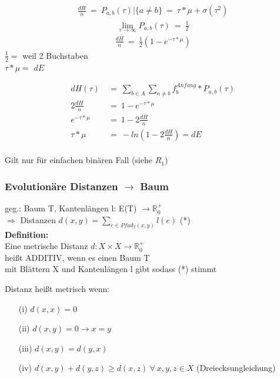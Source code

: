 \begin{align*}
	\frac{dH}{n}~=~P_{a,b} (\tau) | \{a \neq b\}~=~\tau * \mu + \sigma (\tau ^2)
\end{align*}
\begin{align*}
	\lim\limits_{\tau \rightarrow \infty} P_{a,b} (\tau)~=~ \frac{1}{2}
\end{align*}
\begin{align*}
 	\frac{dH}{n}~=~ \frac{1}{2} (1 - e^{-\tau * \mu})
\end{align*} 
$\frac{1}{2} =$ \color{orange} weil 2 Buchstaben\color{black}\\
$\tau * \mu =$ \color{orange} $dE$ \color{black}

\begin{align*}
 	dH(\tau) ~&=~ \sum \limits_{b \in A} \sum \limits_{a \neq b}  f_b^{Anfang} * P_{a,b}(\tau)\\
 	2 \frac{dH}{n} ~&=~ 1 - e^{-\tau * \mu}\\
 	e^{-\tau * \mu} ~&=~ 1 - 2 \frac{dH}{n}\\
 	\tau * \mu ~&=~ -ln (1 - 2 \frac{dH}{n}) = dE
\end{align*} 
\\Gilt nur für einfachen binären Fall (siehe $R_1$)
\subsubsection{Evolutionäre Distanzen $\rightarrow$ Baum}
geg.: Baum T, Kantenlängen l: E(T) $\rightarrow \mathbb {R}_0^+$\\

\hspace{2cm} $\Rightarrow$ Distanzen $d(x,y) = \sum \limits_{e \in Pfad_T (x,y)} l(e)$ \color{orange}(*)\color{black}\\

\textbf{Definition:}\\
Eine metrische Distanz $d: X \times X \rightarrow \mathbb {R}_0^+$ \\
heißt ADDITIV, wenn es einen Baum T\\
mit Blättern X und Kantenlängen l gibt sodass \color{orange}(*)\color{black} stimmt	

Distanz heißt metrisch wenn:
\begin{itemize}
	\item[(i)] $d(x,x) = 0$
	\item[(ii)] $d(x,y) = 0 \rightarrow x = y$
	\item[(iii)] $d(x,y) = d(y,x)$
	\item[(iv)] $d(x,y) + d(y,z) \geq d(x,z)\ \forall\ x, y, z \in X$ (Dreiecksungleichung)
\end{itemize}

